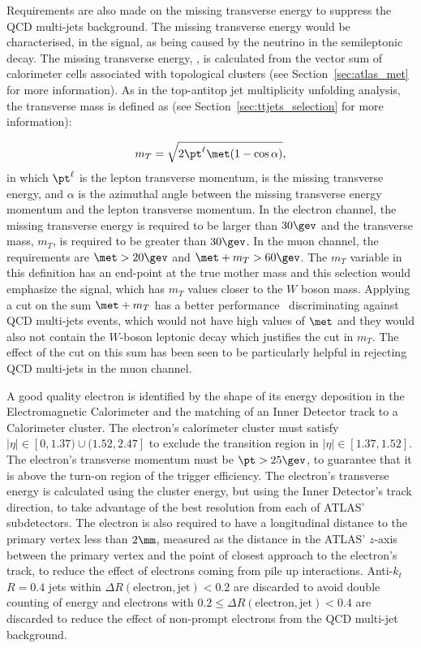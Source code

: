 Requirements are also made on the missing transverse energy to suppress the QCD multi-jets background. The missing transverse energy
would be characterised, in the signal, as being caused by the neutrino in the semileptonic \ttbar decay.
The missing transverse energy, \met, is calculated from the vector sum of calorimeter cells associated with topological clusters (see Section~\ref{sec:atlas_met} for more
information).
As in the top-antitop jet multiplicity unfolding analysis, the transverse mass is defined as (see Section~\ref{sec:ttjets_selection} for more information):

\begin{equation}
\displaystyle
m_T = \sqrt{2 \pt^\ell \met  (1 - \cos{\alpha})},
\label{eq:mt}
\end{equation}
in which $\pt^\ell$ is the lepton transverse momentum, \met is the missing transverse energy, and $\alpha$ is the azimuthal angle between the missing
transverse energy momentum and the lepton transverse momentum.
In the electron channel, the missing transverse energy is required to be larger than $30\gev$ and the transverse mass, $m_T$, is required to be greater than $30\gev$.
In the muon channel, the requirements are $\met > 20\gev$ and $\met + m_T > 60\gev$.
The $m_T$ variable in this definition has an end-point at the true mother mass
and this selection would emphasize the signal, which has $m_T$ values closer to the $W$ boson mass.
Applying a cut on the sum $\met + m_T$ has a better performance~\cite{ttres7paper}
discriminating against QCD multi-jets events, which would not have high
values of $\met$ and they would also not contain the $W$-boson leptonic
decay which justifies the cut in $m_T$. The effect of the cut on this sum
has been seen to be particularly helpful in rejecting QCD multi-jets
in the muon channel.

A good quality electron is identified by the shape of its energy deposition in the Electromagnetic Calorimeter and the matching of an Inner Detector track to
a Calorimeter cluster. The electron's
calorimeter cluster must satisfy $|\eta| \in [0,1.37) \cup (1.52,2.47]$ to exclude the transition region in $|\eta| \in [1.37,1.52]$. The electron's transverse
momentum must be $\pt > 25\gev$, to guarantee that it is above
the turn-on region of the trigger efficiency.
The electron's transverse energy is
calculated using the cluster energy, but using the Inner Detector's track direction, to take advantage of the best resolution from each of ATLAS' subdetectors.
The electron is also required to have a longitudinal distance to the primary vertex less than $2\mm$,
measured as the distance in the ATLAS'
$z$-axis between the primary vertex and the point of closest approach to the electron's track, to reduce the effect of electrons coming from pile up interactions.
Anti-$k_t$ $R=0.4$ jets within $\Delta R(\textrm{electron}, \textrm{jet}) < 0.2$ are discarded to avoid double counting of energy and
electrons with $0.2 \le \Delta R(\textrm{electron}, \textrm{jet}) < 0.4$ are discarded to reduce the effect of non-prompt electrons from the QCD multi-jet background.

